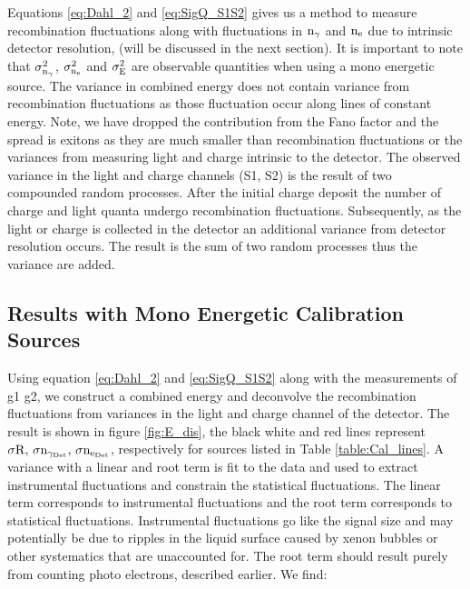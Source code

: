 Equations \ref{eq:Dahl_2} and \ref{eq:SigQ_S1S2} gives us a method to measure recombination fluctuations along with fluctuations in $\rm n_\gamma$ and $\rm n_e$ due to intrinsic detector resolution, (will be discussed in the next section). It is important to note that $\rm \sigma_{n_\gamma}^2$, $\rm \sigma_{n_e}^2$ and $\rm \sigma_{E}^2 $ are observable quantities when using a mono energetic source. The variance in combined energy does not contain variance from recombination fluctuations as those fluctuation occur along lines of constant energy. Note, we have dropped the contribution from the Fano factor and the spread is exitons as they are much smaller than recombination fluctuations or the variances from measuring light and charge intrinsic to the detector. The observed variance in the light and charge channels (S1, S2) is the result of two compounded random processes. After the initial charge deposit the number of charge and light quanta undergo recombination fluctuations. Subsequently, as the light or charge is collected in the detector an additional variance from detector resolution occurs. The result is the sum of two random processes thus the variance are added.



\subsection{Results with Mono Energetic Calibration Sources}

Using equation \ref{eq:Dahl_2} and \ref{eq:SigQ_S1S2} along with the measurements of g1 g2, we construct a combined energy and deconvolve the recombination fluctuations from variances in the light and charge channel of the detector. The result is shown in figure \ref{fig:E_dis}, the black white and red lines represent $\rm \sigma R, \, \sigma n_{\gamma_{Det}}, \,\sigma n_{e_{Det}}$, respectively for sources listed in Table \ref{table:Cal_lines}. A variance with a linear and root term is fit to the data and used to extract instrumental fluctuations and constrain the statistical fluctuations. The linear term corresponds to instrumental fluctuations and the root term corresponds to statistical fluctuations. Instrumental fluctuations go like the signal size and may potentially be due to ripples in the liquid surface caused by xenon bubbles or other systematics that are unaccounted for. The root term should result purely from counting photo electrons, described earlier. We find:


